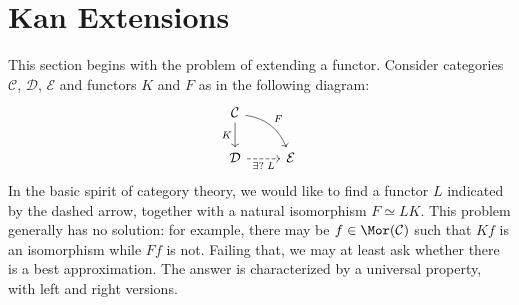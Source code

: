 
\section{Kan Extensions}\label{sec:Kan-extension}
\hypertarget{o014.aljabr2.chapter1.kan-extensions}{ }

This section begins with the problem of extending a functor. Consider
categories $\mathcal{C}$, $\mathcal{D}$, $\mathcal{E}$ and functors $K$ and
$F$ as in the following diagram:
\[\begin{tikzcd}
	\mathcal{C} \arrow[d, "K"'] \arrow[rd, bend left, "F"] & \\
	\mathcal{D} \arrow[dashed, r, "{\exists ? \; L}"'] & \mathcal{E}
\end{tikzcd}\]
In the basic spirit of category theory, we would like to find a functor $L$
indicated by the dashed arrow, together with a natural isomorphism
$F \simeq LK$. This problem generally has no solution: for example, there may
be $f \in \Mor(\mathcal{C})$ such that $Kf$ is an isomorphism while $Ff$ is
not. Failing that, we may at least ask whether there is a best approximation.
The answer is characterized by a universal property, with left and right
versions.

